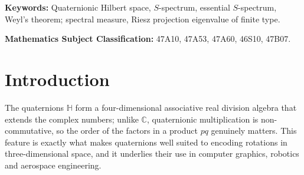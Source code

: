 \documentclass[12pt,a4paper]{article}
\theoremstyle{plain}
\theoremstyle{definition}
\theoremstyle{remark}
\newcommand{\HH}{\mathbb H}
\newcommand{\CC}{\mathbb C}
\begin{document}
{\noindent
\textbf{Keywords:} Quaternionic Hilbert space, $S$-spectrum, essential
$S$-spectrum, Weyl's theorem; spectral measure, Riesz projection
eigenvalue of finite type.

\medskip

\noindent
\textbf{Mathematics Subject Classification:} {47A10, 47A53, 47A60, 46S10, 47B07.}

\section{Introduction}
\label{sec:intro}

The quaternions $\HH$ form a four-dimensional associative real
division algebra that extends the complex numbers; unlike $\CC$,
quaternionic multiplication is non-commutative, so the order of the
factors in a product $pq$ genuinely matters. This feature is exactly
what makes quaternions well suited to encoding rotations in
three-dimensional space, and it underlies their use in computer
graphics, robotics and aerospace engineering.

}
\end{document}
